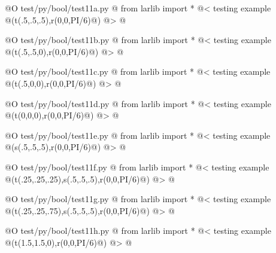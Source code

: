 \documentclass[11pt,oneside]{article}    %
\begin{document}
@O test/py/bool/test11a.py @{
from larlib import *
@< testing example @(t(.5,.5,.5),r(0,0,PI/6)@) @>
@}

@O test/py/bool/test11b.py @{
from larlib import *
@< testing example @(t(.5,.5,0),r(0,0,PI/6)@) @>
@}

@O test/py/bool/test11c.py @{
from larlib import *
@< testing example @(t(.5,0,0),r(0,0,PI/6)@) @>
@}

@O test/py/bool/test11d.py @{
from larlib import *
@< testing example @(t(0,0,0),r(0,0,PI/6)@) @>
@}

@O test/py/bool/test11e.py @{
from larlib import *
@< testing example @(s(.5,.5,.5),r(0,0,PI/6)@) @>
@}

@O test/py/bool/test11f.py @{
from larlib import *
@< testing example @(t(.25,.25,.25),s(.5,.5,.5),r(0,0,PI/6)@) @>
@}

@O test/py/bool/test11g.py @{
from larlib import *
@< testing example @(t(.25,.25,.75),s(.5,.5,.5),r(0,0,PI/6)@) @>
@}

@O test/py/bool/test11h.py @{
from larlib import *
@< testing example @(t(1.5,1.5,0),r(0,0,PI/6)@) @>
@}
\end{document}
